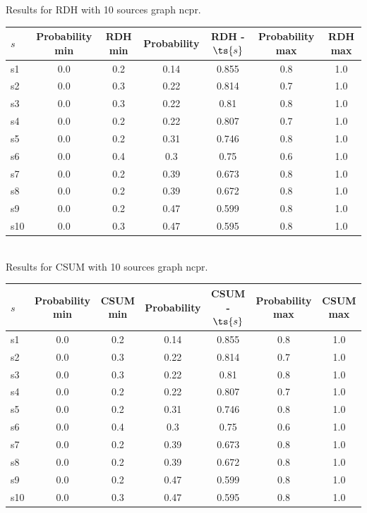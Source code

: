 \documentclass{article}
\begin{document}
\noindent Results for RDH with 10 sources graph ncpr.

\noindent\begin{tabular}{|l|c|c|c|c|c|c|}
\hline
$s$& Probability min & RDH min & Probability & RDH - $\ts{s}$ & Probability max & RDH max\\
\hline
s1 &0.0 & 0.2 & 0.14 & 0.855 & 0.8 & 1.0\\
\hline
s2 &0.0 & 0.3 & 0.22 & 0.814 & 0.7 & 1.0\\
\hline
s3 &0.0 & 0.3 & 0.22 & 0.81 & 0.8 & 1.0\\
\hline
s4 &0.0 & 0.2 & 0.22 & 0.807 & 0.7 & 1.0\\
\hline
s5 &0.0 & 0.2 & 0.31 & 0.746 & 0.8 & 1.0\\
\hline
s6 &0.0 & 0.4 & 0.3 & 0.75 & 0.6 & 1.0\\
\hline
s7 &0.0 & 0.2 & 0.39 & 0.673 & 0.8 & 1.0\\
\hline
s8 &0.0 & 0.2 & 0.39 & 0.672 & 0.8 & 1.0\\
\hline
s9 &0.0 & 0.2 & 0.47 & 0.599 & 0.8 & 1.0\\
\hline
s10 &0.0 & 0.3 & 0.47 & 0.595 & 0.8 & 1.0\\
\hline
\end{tabular}\\

\noindent Results for CSUM with 10 sources graph ncpr.

\noindent\begin{tabular}{|l|c|c|c|c|c|c|}
\hline
$s$& Probability min & CSUM min & Probability & CSUM - $\ts{s}$ & Probability max & CSUM max\\
\hline
s1 &0.0 & 0.2 & 0.14 & 0.855 & 0.8 & 1.0\\
\hline
s2 &0.0 & 0.3 & 0.22 & 0.814 & 0.7 & 1.0\\
\hline
s3 &0.0 & 0.3 & 0.22 & 0.81 & 0.8 & 1.0\\
\hline
s4 &0.0 & 0.2 & 0.22 & 0.807 & 0.7 & 1.0\\
\hline
s5 &0.0 & 0.2 & 0.31 & 0.746 & 0.8 & 1.0\\
\hline
s6 &0.0 & 0.4 & 0.3 & 0.75 & 0.6 & 1.0\\
\hline
s7 &0.0 & 0.2 & 0.39 & 0.673 & 0.8 & 1.0\\
\hline
s8 &0.0 & 0.2 & 0.39 & 0.672 & 0.8 & 1.0\\
\hline
s9 &0.0 & 0.2 & 0.47 & 0.599 & 0.8 & 1.0\\
\hline
s10 &0.0 & 0.3 & 0.47 & 0.595 & 0.8 & 1.0\\
\hline
\end{tabular}\\
\end{document}
